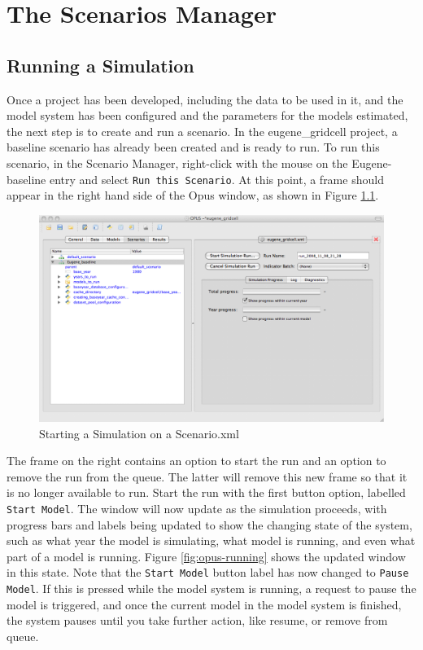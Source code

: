 \chapter{The Scenarios Manager}
\label{chap:scenarios-manager}

\section{Running a Simulation}
Once a project has been developed, including the data to be used in it, and the model system has been configured and the parameters for the models estimated, the next step is to create and run a scenario.  In the eugene\_gridcell project, a baseline scenario has already been created and is ready to run.  To run this scenario, in the Scenario Manager, right-click with the mouse on the Eugene-baseline entry and select \verb#Run this Scenario#.  At this point, a frame should appear in the right hand side of the Opus window, as shown in Figure \ref{fig:opus-start-run}.

\begin{figure}[htp]
\begin{center}
\includegraphics[scale=0.4]{part-gui/images/scenario-manager-start-run.png}
\end{center}
\caption{Starting a Simulation on a Scenario.xml}
\label{fig:opus-start-run}
\end{figure}

The frame on the right contains an option to start the run and an
option to remove the run from the queue.  The latter will remove this
new frame so that it is no longer available to run.  Start the run with
the first button option, labelled \verb#Start Model#.  The window will
now update as the simulation proceeds, with progress bars and labels
being updated to show the changing state of the system, such as what
year the model is simulating, what model is running, and even what part
of a model is running.  Figure \ref{fig:opus-running} shows the updated
window in this state.  Note that the \verb#Start Model#  button label
has now changed to \verb#Pause Model#.  If this is pressed while the
model system is running, a request to pause the model is triggered, and
once the current model in the model system is finished, the system
pauses until you take further action, like resume, or remove from
queue.

